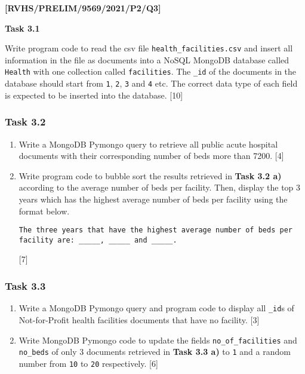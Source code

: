 \item \textbf{{[}RVHS/PRELIM/9569/2021/P2/Q3{]} }

\textbf{Task 3.1}

Write program code to read the csv file \textquotedbl\texttt{health\_facilities.csv}\textquotedbl{}
and insert all information in the file as documents into a NoSQL MongoDB
database called \textquotedbl\texttt{Health}\textquotedbl{} with
one collection called \textquotedbl\texttt{facilities}\textquotedbl .
The \textquotedbl\texttt{\_id}\textquotedbl{} of the documents in
the database should start from \texttt{1}, \texttt{2}, \texttt{3}
and \texttt{4} etc. The correct data type of each field is expected
to be inserted into the database. \hfill{}{[}10{]}

\subsubsection*{Task 3.2 }
\begin{enumerate}
\item Write a MongoDB Pymongo query to retrieve all public acute hospital
documents with their corresponding number of beds more than 7200.
\hfill{}{[}4{]}
\item Write program code to bubble sort the results retrieved in \textbf{Task
3.2 a)} according to the average number of beds per facility. Then,
display the top 3 years which has the highest average number of beds
per facility using the format below. 

\texttt{The three years that have the highest average number of beds
per facility are: \_\_\_\_\_, \_\_\_\_\_ and \_\_\_\_\_. }

\hfill{}{[}7{]}
\end{enumerate}

\subsubsection*{Task 3.3}
\begin{enumerate}
\item Write a MongoDB Pymongo query and program code to display all \textquotedbl\texttt{\_id}\textquotedbl s
of Not-for-Profit health facilities documents that have no facility.
\hfill{}{[}3{]} 
\item Write MongoDB Pymongo code to update the fields \textquotedbl\texttt{no\_of\_facilities}\textquotedbl{}
and \textquotedbl\texttt{no\_beds}\textquotedbl{} of only 3 documents
retrieved in \textbf{Task 3.3 a)} to \texttt{1} and a random number
from \texttt{10} to \texttt{20} respectively. \hfill{}{[}6{]} 
\end{enumerate}